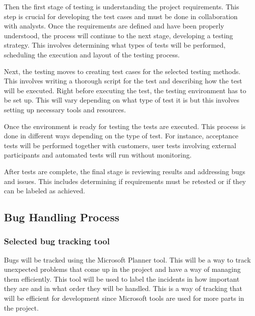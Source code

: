 \documentclass{article}
\begin{document}
Then the first stage of testing is understanding the project requirements. This step is crucial for developing the test cases and must be done in collaboration with analysts. Once the requirements are defined and have been properly understood, the process will continue to the next stage, developing a testing strategy. This involves determining what types of tests will be performed, scheduling the execution and layout of the testing process. \newline

Next, the testing moves to creating test cases for the selected testing methods. This involves writing a thorough script for the test and describing how the test will be executed. Right before executing the test, the testing environment has to be set up. This will vary depending on what type of test it is but this involves setting up necessary tools and resources. \newline

Once the environment is ready for testing the tests are executed. This process is done in different ways depending on the type of test. For instance, acceptance tests will be performed together with customers, user tests involving external participants and automated tests will run without monitoring. \newline

After tests are complete, the final stage is reviewing results and addressing bugs and issues. This includes determining if requirements must be retested or if they can be labeled as achieved. 




\subsection{Bug Handling Process}
\subsubsection{Selected bug tracking tool} 
Bugs will be tracked using the Microsoft Planner tool. This will be a way to track unexpected problems that come up in the project and have a way of managing them efficiently. This tool will be used to label the incidents in how important they are and in what order they will be handled. This is a way of tracking that will be efficient for development since Microsoft tools are used for more parts in the project. 
\end{document}
